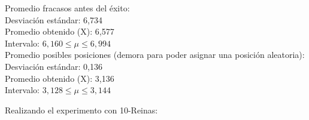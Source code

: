 \documentclass[a4paper,10pt]{article}
\begin{document}
\begin{itemize}
Promedio fracasos antes del éxito:\\

Desviación estándar: 6,734 \\
Promedio obtenido (X): 6,577 \\
Intervalo: $6,160 \leq \mu \leq 6,994$ \\

Promedio posibles posiciones (demora para poder asignar una posición aleatoria):\\

Desviación estándar: 0,136 \\
Promedio obtenido (X): 3,136\\
Intervalo: $ 3,128 \leq \mu \leq 3,144$ \\

\end{itemize}


Realizando el experimento con 10-Reinas:
\end{document}
